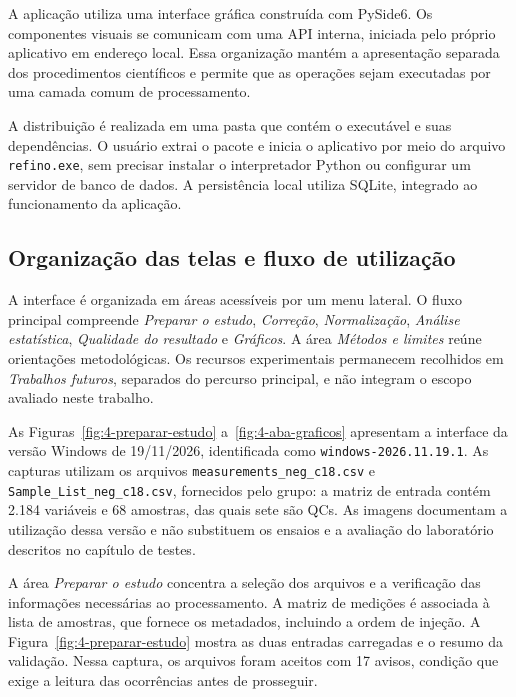 A aplicação utiliza uma interface gráfica construída com PySide6. Os componentes visuais se comunicam com uma API interna, iniciada pelo próprio aplicativo em endereço local. Essa organização mantém a apresentação separada dos procedimentos científicos e permite que as operações sejam executadas por uma camada comum de processamento.

A distribuição é realizada em uma pasta que contém o executável e suas dependências. O usuário extrai o pacote e inicia o aplicativo por meio do arquivo \texttt{refino.exe}, sem precisar instalar o interpretador Python ou configurar um servidor de banco de dados. A persistência local utiliza SQLite, integrado ao funcionamento da aplicação.

\subsection{Organização das telas e fluxo de utilização}
\label{subsec:organizacao-telas-fluxo}

A interface é organizada em áreas acessíveis por um menu lateral. O fluxo principal compreende \textit{Preparar o estudo}, \textit{Correção}, \textit{Normalização}, \textit{Análise estatística}, \textit{Qualidade do resultado} e \textit{Gráficos}. A área \textit{Métodos e limites} reúne orientações metodológicas. Os recursos experimentais permanecem recolhidos em \textit{Trabalhos futuros}, separados do percurso principal, e não integram o escopo avaliado neste trabalho.

As Figuras~\ref{fig:4-preparar-estudo} a~\ref{fig:4-aba-graficos} apresentam a interface da versão Windows de 19/11/2026, identificada como \texttt{windows-\allowbreak{}2026.\allowbreak{}11.\allowbreak{}19.\allowbreak{}1}. As capturas utilizam os arquivos \texttt{measurements\_\allowbreak{}neg\_\allowbreak{}c18.csv} e \texttt{Sample\_\allowbreak{}List\_\allowbreak{}neg\_\allowbreak{}c18.csv}, fornecidos pelo grupo: a matriz de entrada contém 2.184 variáveis e 68 amostras, das quais sete são QCs. As imagens documentam a utilização dessa versão e não substituem os ensaios e a avaliação do laboratório descritos no capítulo de testes.

A área \textit{Preparar o estudo} concentra a seleção dos arquivos e a verificação das informações necessárias ao processamento. A matriz de medições é associada à lista de amostras, que fornece os metadados, incluindo a ordem de injeção. A Figura~\ref{fig:4-preparar-estudo} mostra as duas entradas carregadas e o resumo da validação. Nessa captura, os arquivos foram aceitos com 17 avisos, condição que exige a leitura das ocorrências antes de prosseguir.

